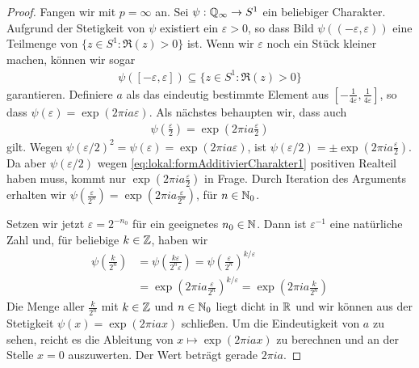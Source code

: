 		\begin{proof}
			Fangen wir mit $p=\infty$ an. Sei $\psi: \mathbb{Q}_\infty \to S^1$ ein beliebiger Charakter.
			Aufgrund der Stetigkeit von $\psi$ existiert ein $\varepsilon > 0$, so dass Bild $\psi((-\varepsilon, \varepsilon))$ eine Teilmenge von $\{z\in S^1: \Re(z)>0\}$ ist.
			Wenn wir $\varepsilon$ noch ein Stück kleiner machen, können wir sogar 
			\begin{align}\label{eq:lokal:formAdditivierCharakter1}
				\psi([-\varepsilon, \varepsilon]) \subseteq \{z\in S^1: \Re(z)>0\}
			\end{align}
			garantieren.
			Definiere $a$ als das eindeutig bestimmte Element aus $[-\frac{1}{4\varepsilon},\frac{1}{4\varepsilon}]$, so dass $\psi (\varepsilon) = \exp(2\pi i a \varepsilon)$.
			Als nächstes behaupten wir, dass auch
			\begin{align*}
				\psi \left(\frac{\varepsilon}{2}\right) = \exp\left(2\pi i a \frac{\varepsilon}{2}\right)
			\end{align*}
			gilt.
			Wegen $\psi (\varepsilon/2)^2 = \psi (\varepsilon) = \exp(2\pi i a \varepsilon)$, ist $\psi (\varepsilon/2) = \pm \exp(2\pi i a \frac{\varepsilon}{2})$.
			Da aber $\psi(\varepsilon/2)$ wegen \eqref{eq:lokal:formAdditivierCharakter1} positiven Realteil haben muss, kommt nur $ \exp(2\pi i a \frac{\varepsilon}{2})$ in Frage.
			Durch Iteration des Arguments erhalten wir $\psi \left(\frac{\varepsilon}{2^n}\right) = \exp(2\pi i a \frac{\varepsilon}{2^n})$, für $n\in \mathbb{N}_0$.
			
			Setzen wir jetzt $\varepsilon = 2^{-n_0}$ für ein geeignetes $n_0\in\mathbb{N}$.
			Dann ist $\varepsilon^{-1}$ eine natürliche Zahl und, für beliebige $k\in\mathbb{Z}$, haben wir
			\begin{align*}
				\psi \left(\frac{k} {2^{n}}\right) &= \psi \left(\frac{k\varepsilon} {2^{n}\varepsilon}\right) 
										= \psi \left(\frac{\varepsilon} {2^{n}}\right) ^{k/\varepsilon} 
										\\&= \exp\left(2\pi i a \frac{\varepsilon}{2^n}\right)^{k/\varepsilon}%
										= \exp\left(2\pi i a \frac{k}{2^n}\right)
			\end{align*}
			Die Menge aller $\frac{k}{2^n}$ mit $k\in \mathbb{Z}$ und $n\in \mathbb{N}_0$ liegt dicht in $\mathbb{R}$ und wir können aus der Stetigkeit $\psi(x) = \exp(2\pi i a x)$ schließen.
			Um die Eindeutigkeit von $a$ zu sehen, reicht es die Ableitung von $x \mapsto \exp(2\pi i a x)$ zu berechnen und an der Stelle $x=0$ auszuwerten.
			Der Wert beträgt gerade $2\pi i a$.
			

\end{proof}
